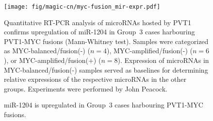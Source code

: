 \documentclass[11pt,letterpaper]{article}
\theoremstyle{definition}
\begin{document}
\begin{figure}[h]
	\begin{center}
		\texttt{[image: fig/magic-cn/myc-fusion\_mir-expr.pdf]}
	\end{center}
	\caption{miR-1204 is upregulated in Group~3 cases harbouring PVT1-MYC fusions.}
	Quantitative RT-PCR analysis of microRNAs hosted by PVT1 confirms upregulation of miR-1204 in Group~3 cases harbouring PVT1-MYC fusions (Mann-Whitney test). Samples were categorized as MYC-balanced/fusion(-) ($n = 4$), MYC-amplified/fusion(-) ($n = 6$), or MYC-amplified/fusion(+) ($n = 8$). Expression of microRNAs in MYC-balanced/fusion(-) samples served as baselines for determining relative expressions of the respective microRNAs in the other groups. Experiments were performed by John Peacock.
	\label{fig:myc-fusion_mir-expr}
\end{figure}

\clearpage

\section{}

\begin{multicols}{2}
\small
{}
\end{multicols}
\end{document}
